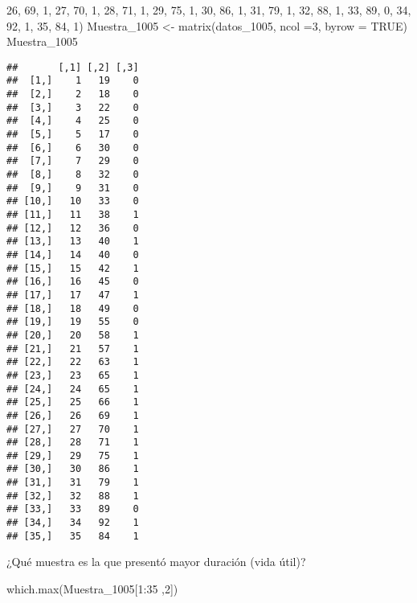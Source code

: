 \documentclass[
]{article}
\newenvironment{Shaded}{\begin{snugshade}}{\end{snugshade}}
\newcommand{\AttributeTok}[1]{\textcolor[rgb]{0.77,0.63,0.00}{#1}}
\newcommand{\ConstantTok}[1]{\textcolor[rgb]{0.00,0.00,0.00}{#1}}
\newcommand{\DecValTok}[1]{\textcolor[rgb]{0.00,0.00,0.81}{#1}}
\newcommand{\FunctionTok}[1]{\textcolor[rgb]{0.00,0.00,0.00}{#1}}
\newcommand{\NormalTok}[1]{#1}
\newcommand{\OtherTok}[1]{\textcolor[rgb]{0.56,0.35,0.01}{#1}}
\newcommand{\SpecialCharTok}[1]{\textcolor[rgb]{0.00,0.00,0.00}{#1}}
\begin{document}
\begin{Shaded}
\begin{Highlighting}[]
\DecValTok{26}\NormalTok{, }\DecValTok{69}\NormalTok{, }\DecValTok{1}\NormalTok{,}
\DecValTok{27}\NormalTok{, }\DecValTok{70}\NormalTok{, }\DecValTok{1}\NormalTok{,}
\DecValTok{28}\NormalTok{, }\DecValTok{71}\NormalTok{, }\DecValTok{1}\NormalTok{,}
\DecValTok{29}\NormalTok{, }\DecValTok{75}\NormalTok{, }\DecValTok{1}\NormalTok{,}
\DecValTok{30}\NormalTok{, }\DecValTok{86}\NormalTok{, }\DecValTok{1}\NormalTok{,}
\DecValTok{31}\NormalTok{, }\DecValTok{79}\NormalTok{, }\DecValTok{1}\NormalTok{,}
\DecValTok{32}\NormalTok{, }\DecValTok{88}\NormalTok{, }\DecValTok{1}\NormalTok{,}
\DecValTok{33}\NormalTok{, }\DecValTok{89}\NormalTok{, }\DecValTok{0}\NormalTok{,}
\DecValTok{34}\NormalTok{, }\DecValTok{92}\NormalTok{, }\DecValTok{1}\NormalTok{,}
\DecValTok{35}\NormalTok{, }\DecValTok{84}\NormalTok{, }\DecValTok{1}\NormalTok{)}
\NormalTok{Muestra\_1005 }\OtherTok{\textless{}{-}} \FunctionTok{matrix}\NormalTok{(datos\_1005, }\AttributeTok{ncol =}\DecValTok{3}\NormalTok{, }\AttributeTok{byrow =} \ConstantTok{TRUE}\NormalTok{)}
\NormalTok{Muestra\_1005}
\end{Highlighting}
\end{Shaded}

\begin{verbatim}
##       [,1] [,2] [,3]
##  [1,]    1   19    0
##  [2,]    2   18    0
##  [3,]    3   22    0
##  [4,]    4   25    0
##  [5,]    5   17    0
##  [6,]    6   30    0
##  [7,]    7   29    0
##  [8,]    8   32    0
##  [9,]    9   31    0
## [10,]   10   33    0
## [11,]   11   38    1
## [12,]   12   36    0
## [13,]   13   40    1
## [14,]   14   40    0
## [15,]   15   42    1
## [16,]   16   45    0
## [17,]   17   47    1
## [18,]   18   49    0
## [19,]   19   55    0
## [20,]   20   58    1
## [21,]   21   57    1
## [22,]   22   63    1
## [23,]   23   65    1
## [24,]   24   65    1
## [25,]   25   66    1
## [26,]   26   69    1
## [27,]   27   70    1
## [28,]   28   71    1
## [29,]   29   75    1
## [30,]   30   86    1
## [31,]   31   79    1
## [32,]   32   88    1
## [33,]   33   89    0
## [34,]   34   92    1
## [35,]   35   84    1
\end{verbatim}

¿Qué muestra es la que presentó mayor duración (vida útil)?

\begin{Shaded}
\begin{Highlighting}[]
\FunctionTok{which.max}\NormalTok{(Muestra\_1005[}\DecValTok{1}\SpecialCharTok{:}\DecValTok{35}\NormalTok{ ,}\DecValTok{2}\NormalTok{])}
\end{Highlighting}
\end{Shaded}
\end{document}
